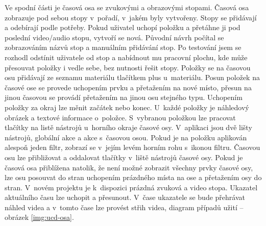 Ve spodní části je časová osa se zvukovými a obrazovými stopami. Časová osa zobrazuje pod sebou stopy v~pořadí, v~jakém byly vytvořeny. Stopy se přidávají a odebírají podle potřeby. Pokud uživatel uchopí položku a přetáhne ji pod poslední video/audio stopu, vytvoří se nová. Původní návrh počítal se zobrazováním názvů stop a manuálním přidávání stop. Po testování jsem se rozhodl odstínit uživatele od stop a nabídnout mu pracovní plochu, kde může přesouvat položky i vedle sebe, bez nutnosti řešit stopy. Položky se na časovou osu přidávají ze seznamu materiálu tlačítkem plus u~materiálu. Posun položek na časové ose se provede uchopením prvku a přetažením na nové místo, přesun na jinou časovou se provádí přetažením na jinou osu stejného typu. Uchopením položky za okraj lze měnit začátek nebo konec. U~každé položky je náhledový obrázek a textové informace o~položce. S~vybranou položkou lze pracovat tlačítky na listě nástrojů u~horního okraje časové osy. V~aplikaci jsou dvě lišty nástrojů, globální akce a akce s~časovou osou. Pokud je na položku aplikován alespoň jeden filtr, zobrazí se v~jejím levém horním rohu  s~ikonou filtru. Časovou osu lze přibližovat a oddalovat tlačítky v~liště nástrojů časové osy. Pokud je časová osa přiblížena natolik, že není možné zobrazit všechny prvky časové osy, lze osu posouvat do stran uchopením prázdného místa na ose a přetažením osy do stran. V~novém projektu je k~dispozici prázdná zvuková a video stopa. Ukazatel aktuálního času lze uchopit a přesunout. V~čase ukazatele se bude přehrávat náhled videa a v~tomto čase lze provést střih videa, diagram případů užití -- obrázek \ref{img:ucd-osa}.
